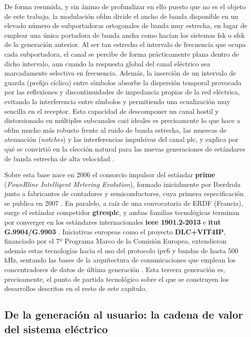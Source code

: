De forma resumida, y sin ánimo de profundizar en ello puesto que no es el objeto de este trabajo, la modulación \gls{ofdm} divide el ancho de banda disponible en un elevado número de subportadoras ortogonales de banda muy estrecha, en lugar de emplear una única portadora de banda ancha como hacían los sistemas \gls{fsk} o \gls{sfsk} de la generación anterior. Al ser tan estrecho el intervalo de frecuencia que ocupa cada subportadora, el canal se percibe de forma prácticamente plana dentro de dicho intervalo, aun cuando la respuesta global del canal eléctrico sea marcadamente selectiva en frecuencia. Además, la inserción de un intervalo de guarda (prefijo cíclico) entre símbolos absorbe la dispersión temporal provocada por las reflexiones y discontinuidades de impedancia propias de la red eléctrica, evitando la interferencia entre símbolos y permitiendo una ecualización muy sencilla en el receptor. Esta capacidad de descomponer un canal hostil y distorsionado en múltiples subcanales casi ideales es precisamente lo que hace a \gls{ofdm} mucho más robusto frente al ruido de banda estrecha, las muescas de atenuación (\textit{notches}) y las interferencias impulsivas del canal \gls{plc}, y explica por qué se convirtió en la elección natural para las nuevas generaciones de estándares de banda estrecha de alta velocidad \cite{5764444}.

Sobre esta base nace en 2006 el consorcio impulsor del estándar \textbf{\gls{prime}} (\textit{PoweRline Intelligent Metering Evolution}), formado inicialmente por Iberdrola junto a fabricantes de contadores y semiconductores, cuya primera especificación se publica en 2007 \cite{5764444, SHARMA2017704}. En paralelo, a raíz de una convocatoria de ERDF (Francia), surge el estándar competidor \textbf{\gls{gtresplc}}, y ambas familias tecnológicas terminan por converger en los estándares internacionales \textbf{\gls{ieee} 1901.2-2013} e \textbf{\gls{itut} G.9904/G.9903} \cite{SHARMA2017704, 5764444}. Iniciativas europeas como el proyecto \textbf{DLC+VIT4IP}, financiado por el 7º Programa Marco de la Comisión Europea, extendieron además estas tecnologías hacia el uso del protocolo \gls{ipv6} y bandas de hasta 500 kHz, sentando las bases de la arquitectura de comunicaciones que emplean los concentradores de datos de última generación \cite{5764443}. Esta tercera generación es, precisamente, el punto de partida tecnológico sobre el que se construyen los desarrollos descritos en el resto de este capítulo.

\subsection{De la generación al usuario: la cadena de valor del sistema eléctrico}
\label{subsec:cadena_valor_electrico}

